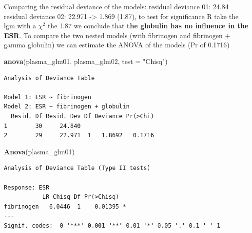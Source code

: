 \documentclass[
]{article}
\newenvironment{Shaded}{\begin{snugshade}}{\end{snugshade}}
\newcommand{\CommentTok}[1]{\textcolor[rgb]{0.56,0.35,0.01}{\textit{#1}}}
\newcommand{\DataTypeTok}[1]{\textcolor[rgb]{0.13,0.29,0.53}{#1}}
\newcommand{\DecValTok}[1]{\textcolor[rgb]{0.00,0.00,0.81}{#1}}
\newcommand{\KeywordTok}[1]{\textcolor[rgb]{0.13,0.29,0.53}{\textbf{#1}}}
\newcommand{\NormalTok}[1]{#1}
\newcommand{\OperatorTok}[1]{\textcolor[rgb]{0.81,0.36,0.00}{\textbf{#1}}}
\newcommand{\OtherTok}[1]{\textcolor[rgb]{0.56,0.35,0.01}{#1}}
\newcommand{\StringTok}[1]{\textcolor[rgb]{0.31,0.60,0.02}{#1}}
\begin{document}
Comparing the residual deviance of the models: residual deviance 01:
24.84 residual deviance 02: 22.971 -\textgreater{} 1.869 (1.87), to test
for significance R take the lgm with a \(\chi^2\) the 1.87 we conclude
that \textbf{the globulin has no influence in the ESR}. To compare the
two nested models (with fibrinogen and fibrinogen + gamma globulin) we
can estimate the ANOVA of the models (Pr of 0.1716)

\begin{Shaded}
\begin{Highlighting}[]
\KeywordTok{anova}\NormalTok{(plasma_glm01, plasma_glm02, }\DataTypeTok{test =} \StringTok{"Chisq"}\NormalTok{)}
\end{Highlighting}
\end{Shaded}

\begin{verbatim}
Analysis of Deviance Table

Model 1: ESR ~ fibrinogen
Model 2: ESR ~ fibrinogen + globulin
  Resid. Df Resid. Dev Df Deviance Pr(>Chi)
1        30     24.840                     
2        29     22.971  1   1.8692   0.1716
\end{verbatim}

\begin{Shaded}
\begin{Highlighting}[]
\KeywordTok{Anova}\NormalTok{(plasma_glm01)}
\end{Highlighting}
\end{Shaded}

\begin{verbatim}
Analysis of Deviance Table (Type II tests)

Response: ESR
           LR Chisq Df Pr(>Chisq)  
fibrinogen   6.0446  1    0.01395 *
---
Signif. codes:  0 '***' 0.001 '**' 0.01 '*' 0.05 '.' 0.1 ' ' 1
\end{verbatim}

\begin{Shaded}
\end{Shaded}
\end{document}
